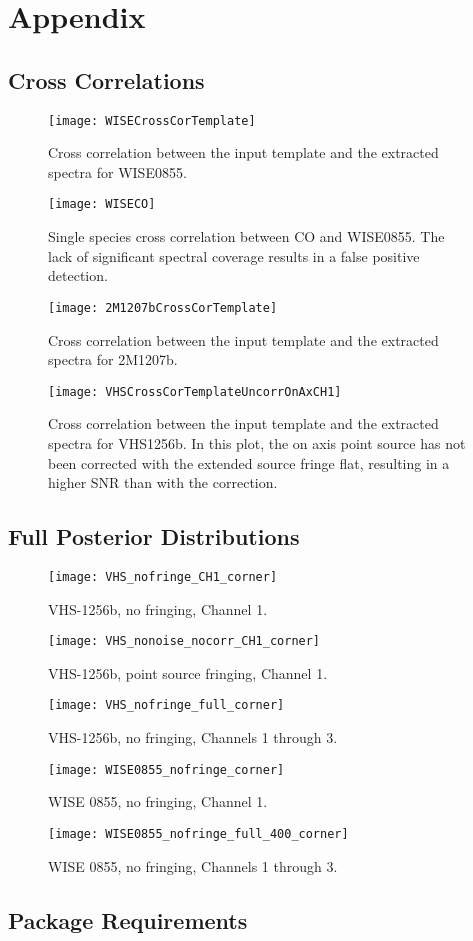 \appendix
\chapter{Appendix}
\section{Cross Correlations}
\begin{figure}[h]
	\texttt{[image: WISECrossCorTemplate]}
	\caption{Cross correlation between the input template and the extracted spectra for WISE0855.}
\end{figure}
\begin{figure}[h]
	\texttt{[image: WISECO]}
	\caption{Single species cross correlation between CO and WISE0855. The lack of significant spectral coverage results in a false positive detection.}
	\label{fig:wiseco}
\end{figure}
\begin{figure}[h]
	\texttt{[image: 2M1207bCrossCorTemplate]}
	\caption{Cross correlation between the input template and the extracted spectra for 2M1207b.}
\end{figure}
\begin{figure}[h]
	\texttt{[image: VHSCrossCorTemplateUncorrOnAxCH1]}
	\caption{Cross correlation between the input template and the extracted spectra for VHS1256b. In this plot, the on axis point source has not been corrected with the extended source fringe flat, resulting in a higher SNR than with the correction.}
\end{figure}

\clearpage
\section{Full Posterior Distributions}\label{app:post}
\begin{figure}[h]
	\centering
	\texttt{[image: VHS\_nofringe\_CH1\_corner]}
	\caption{VHS-1256b, no fringing, Channel 1.}
\end{figure}
\begin{figure}[h]
	\centering
	\texttt{[image: VHS\_nonoise\_nocorr\_CH1\_corner]}
	\caption{VHS-1256b, point source fringing, Channel 1.}
\end{figure}
\begin{figure}[h]
	\centering
	\texttt{[image: VHS\_nofringe\_full\_corner]}
	\caption{VHS-1256b, no fringing, Channels 1 through 3.}
\end{figure}
\begin{figure}[h]
	\centering
	\texttt{[image: WISE0855\_nofringe\_corner]}
	\caption{WISE 0855, no fringing, Channel 1.}
\end{figure}
\begin{figure}[h]
	\centering
	\texttt{[image: WISE0855\_nofringe\_full\_400\_corner]}
	\caption{WISE 0855, no fringing, Channels 1 through 3.}
\end{figure}
\clearpage
\section{Package Requirements}

